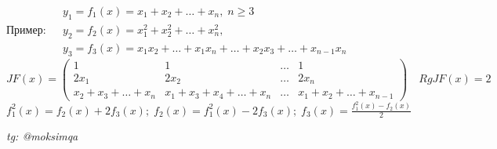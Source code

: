 \documentclass[../main.tex]{subfiles}
\begin{document}
Пример: 
$\begin{aligned}
&y_{1} = f_{1}(x) = x_{1}+ x_{2}+ \dots +x_{n}, \;n\geqslant 3 \\ 
&y_{2} = f_{2}(x) =x_{1}^{2}+x_{2}^{2}+\dots+x_{n}^{2}, \\ 
&y_{3} = f_{3}(x) = x_{1}x_{2}+\dots+x_{1}x_{n}+\dots + x_{2}x_{3} + \dots + x_{n-1}x_{n} 
\end{aligned}$\\
$JF(x) = \begin{pmatrix}
    1& 1& \dots & 1 \\
    2x_{1} & 2x_{2} & \dots & 2x_{n} \\
    x_{2}+x_{3}+\dots+x_{n} & x_{1}+x_{3}+x_{4}+\dots+x_{n} & \dots & x_{1}+x_{2}+\dots+x_{n-1} 
\end{pmatrix} \quad RgJF(x) = 2 $
\\$f_{1}^{2}(x) = f_{2}(x) + 2 f_{3}(x); \; f_{2}(x) = f_{1}^{2}(x) - 2f_{3}(x); \; f_{3}(x) = \frac{f_{1}^{2}(x) - f_{2}(x)}{2} $














\vspace{1cm}
\begin{flushright}
    \textit{tg: @moksimqa}
\end{flushright}
\end{document}
